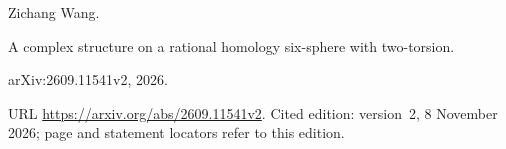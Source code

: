 Zichang Wang.

\newblock A complex structure on a rational homology six-sphere with
  two-torsion.

\newblock arXiv:2609.11541v2, 2026.

\newblock URL \url{https://arxiv.org/abs/2609.11541v2}.
\newblock Cited edition: version~2, 8 November 2026; page and statement locators refer to this edition.

